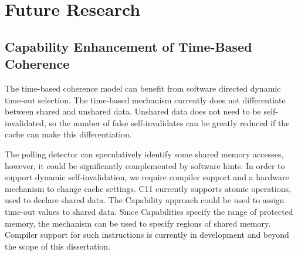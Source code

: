 \begin{comment}
		The time-based coherence mechanism described in this dissertation is proof that cache coherence can be achieved without any explicit coherence communication. This scheme maintains global coherence by exploiting common software synchronisation techniques (barriers and locks) and by periodically auto-updating stale cached data. The coherence scheme complies with a well defined and wide used relaxed memory consistency model, which provides strong programmer assurances and software guarantees.
		
		The time-based coherence model can be competitive against a conventional directory-based coherence protocol, however, certain hardware optimisations are necessary. The absence of explicit coherence messaging reduces the hardware logic overheads of the time-based protocol, potentially reducing the coherence communication energy expenditure. However, further evaluation is necessary to verify the energy costs.
		
		The time-based coherence model can provide some mitigation against private cache side-channel attacks. It uses the software synchronisation mechanisms for cache flushing and adds entropy to memory access latency. The coherence scheme does not actively protect the last level cache, however, the cache could be adapted to use this mitigation technique.
\end{comment}
	
	\section{Future Research}
		\label{section_further_research}
		
		\subsection{Capability Enhancement of Time-Based Coherence}
			The time-based coherence model can benefit from software directed dynamic time-out selection. The time-based mechanism currently does not differentiate between shared and unshared data. Unshared data does not need to be self-invalidated, so the number of false self-invalidates can be greatly reduced if the cache can make this differentiation. 
			
			The polling detector can speculatively identify some shared memory accesses, however, it could be significantly complemented by software hints. In order to support dynamic self-invalidation, we require compiler support and a hardware mechanism to change cache settings. C11 currently supports atomic operations, used to declare shared data. The Capability approach could be used to assign time-out values to shared data. Since Capabilities specify the range of protected memory, the mechanism can be used to specify regions of shared memory. Compiler support for such instructions is currently in development and beyond the scope of this dissertation.
	

